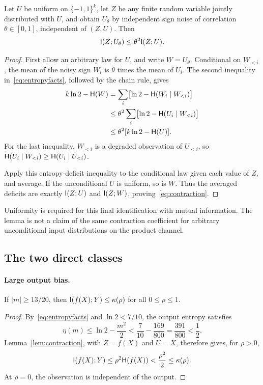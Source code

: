 \begin{lemma}\label{lem:contraction}
Let $U$ be uniform on $\{-1,1\}^k$, let $Z$ be any finite random variable jointly distributed with $U$, and obtain $U_\theta$ by independent sign noise of correlation $\theta\in[0,1]$, independent of $(Z,U)$. Then
\begin{equation}\label{eq:contraction}
\mathsf I(Z;U_\theta)\le\theta^2\mathsf I(Z;U).
\end{equation}
\end{lemma}
\begin{proof}
First allow an arbitrary law for $U$, and write $W=U_\theta$. Conditional on $W_{<i}$, the mean of the noisy sign $W_i$ is $\theta$ times the mean of $U_i$. The second inequality in~\eqref{eq:entropyfacts}, followed by the chain rule, gives
\begin{align*}
k\ln2-\mathsf H(W)
&=\sum_i\bigl[\ln2-\mathsf H(W_i\mid W_{<i})\bigr]\\
&\le\theta^2\sum_i\bigl[\ln2-\mathsf H(U_i\mid W_{<i})\bigr]\\
&\le\theta^2[k\ln2-\mathsf H(U)].
\end{align*}
For the last inequality, $W_{<i}$ is a degraded observation of $U_{<i}$, so $\mathsf H(U_i\mid W_{<i})\ge\mathsf H(U_i\mid U_{<i})$.

Apply this entropy-deficit inequality to the conditional law given each value of $Z$, and average. If the unconditional $U$ is uniform, so is $W$. Thus the averaged deficits are exactly $\mathsf I(Z;U)$ and $\mathsf I(Z;W)$, proving~\eqref{eq:contraction}.
\end{proof}
Uniformity is required for this final identification with mutual information. The lemma is not a claim of the same contraction coefficient for arbitrary unconditional input distributions on the product channel.

\subsection{The two direct classes}\paragraph{Large output bias.}
\begin{lemma}\label{lem:bias}
If $|m|\ge13/20$, then $\mathsf I(f(X);Y)\le\kappa(\rho)$ for all $0\le\rho\le1$.
\end{lemma}
\begin{proof}
By~\eqref{eq:entropyfacts} and $\ln2<7/10$, the output entropy satisfies
\[
\eta(m)\le\ln2-\frac{m^2}{2}<\frac7{10}-\frac{169}{800}=\frac{391}{800}<\frac12.
\] Lemma~\ref{lem:contraction}, with $Z=f(X)$ and $U=X$, therefore gives, for $\rho>0$,
\[
\mathsf I(f(X);Y)\le\rho^2\mathsf H(f(X))<\frac{\rho^2}{2}\le\kappa(\rho).
\]
At $\rho=0$, the observation is independent of the output.
\end{proof}

